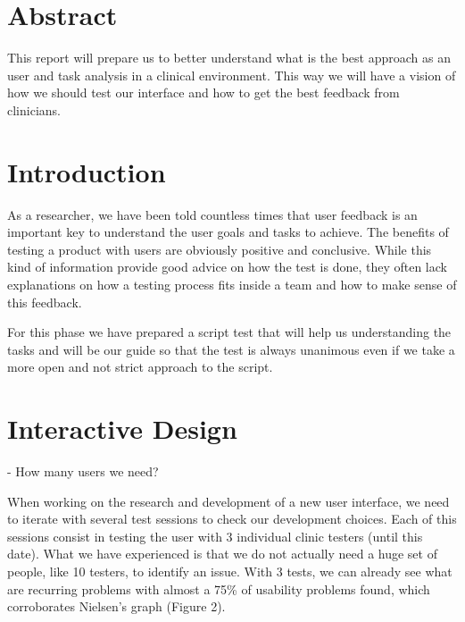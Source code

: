 \section{Abstract}

This report will prepare us to better understand what is the best approach as an user and task analysis in a clinical environment. This way we will have a vision of how we should test our interface and how to get the best feedback from clinicians.

\section{Introduction}

As a researcher, we have been told countless times that user feedback is an important key to understand the user goals and tasks to achieve. The benefits of testing a product with users are obviously positive and conclusive. While this kind of information provide good advice on how the test is done, they often lack explanations on how a testing process fits inside a team and how to make sense of this feedback.

For this phase we have prepared a script test that will help us understanding the tasks and will be our guide so that the test is always unanimous even if we take a more open and not strict approach to the script.

\clearpage

\section{Interactive Design}

- How many users we need?

When working on the research and development of a new user interface, we need to iterate with several test sessions to check our development choices. Each of this sessions consist in testing the user with 3 individual clinic testers (until this date). What we have experienced is that we do not actually need a huge set of people, like 10 testers, to identify an issue. With 3 tests, we can already see what are recurring problems with almost a 75\% of usability problems found, which corroborates Nielsen’s graph \cite{needTest} (Figure 2).

